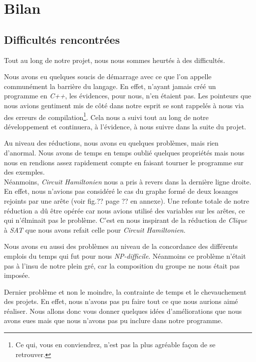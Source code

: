  \section{Bilan}
 
  \subsection{Difficultés rencontrées}
  Tout au long de notre projet, nous nous sommes heurtés à des
  difficultés.

  Nous avons eu quelques soucis de démarrage avec ce que l'on appelle
  communément la barrière du langage. En effet, n'ayant jamais créé un
  programme en \emph{C++}, les évidences, pour nous, n'en étaient
  pas. Les pointeurs que nous avions gentiment mis de côté dans notre
  esprit se sont rappelés à nous via des erreurs de
  compilation\footnote{Ce qui, vous en conviendrez, n'est pas la plus
  agréable façon de se retrouver.}. Cela nous a suivi tout au long de
  notre développement et continuera, à l'évidence, à nous suivre dans la
  suite du projet. 

  Au niveau des réductions, nous avons eu quelques problèmes, mais rien
  d'anormal. Nous avons de temps en temps oublié quelques propriétés
  mais nous nous en rendions assez rapidement compte en faisant tourner
  le programme sur des exemples.\\
  Néanmoins, \emph{Circuit Hamiltonien} nous a pris à revers dans la
  dernière ligne droite. En effet, nous n'avions pas considéré le cas du
  graphe formé de deux losanges rejoints par une arête (voir fig.?? page
  ?? en annexe). Une refonte totale de notre réduction a dû être opérée
  car nous avions utilisé des variables sur les arêtes, ce qui
  n'élminait pas le problème. C'est en nous inspirant de la réduction de
  \emph{Clique} à \emph{SAT} que nous avons refait celle pour
  \emph{Circuit Hamiltonien}.

  Nous avons eu aussi des problèmes au niveau de la concordance des
  différents emplois du temps qui fut pour nous
  \emph{NP-difficile}. Néanmoins ce problème n'était pas à l'insu de
  notre plein gré, car la composition du groupe ne nous était pas
  imposée.

  Dernier problème et non le moindre, la contrainte de temps et le
  chevauchement des projets. En effet, nous n'avons pas pu faire tout ce
  que nous aurions aimé réaliser. Nous allons donc vous donner quelques
  idées d'améliorations que nous avons eues mais que nous n'avons pas pu
  inclure dans notre programme.
  
